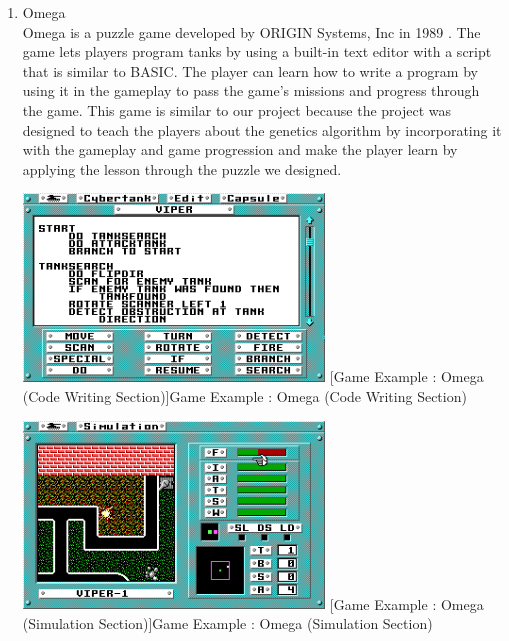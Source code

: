 \documentclass[12pt,oneside,openright,a4paper]{cpe-english-project}
\begin{document}
\begin{enumerate}
	\item Omega \\
	Omega is a puzzle game developed by ORIGIN Systems, Inc in 1989 \cite{mobygamesomega}. The game lets players program tanks by using a built-in text editor with a script that is similar to BASIC. The player can learn how to write a program by using it in the gameplay to pass the game’s missions and progress through the game. This game is similar to our project because the project was designed to teach the players about the genetics algorithm by incorporating it with the gameplay and game progression and make the player learn by applying the lesson through the puzzle we designed. \\
	\begin{minipage}[c]{\textwidth}\centering
	\includegraphics[width=8cm]{figure/related-work-omega-code.png}
	[Game Example : Omega (Code Writing Section)]{Game Example : Omega (Code Writing Section) \cite{mobygamesomega}}
	\label{fig:related-work-omega-code}
	\end{minipage}
	\begin{minipage}[c]{\textwidth}\centering
	\includegraphics[width=8cm]{figure/related-work-omega-sim.png}
	[Game Example : Omega (Simulation Section)]{Game Example : Omega (Simulation Section) \cite{mobygamesomega}}
	\label{fig:related-work-omega-sim}
	\end{minipage}


\end{enumerate}
\end{document}
